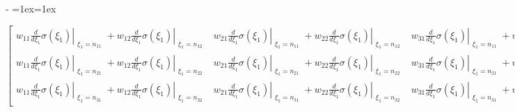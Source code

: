\documentclass[letterpaper,10pt,english]{sphinxmanual}
\makeatletter
\newenvironment{nbsphinxfancyoutput}{%
    \let\sphinxincludegraphics\nbsphinxincludegraphics
    \nbsphinx@image@maxheight\textheight
    \advance\nbsphinx@image@maxheight -2\fboxsep   %
    \advance\nbsphinx@image@maxheight -2\fboxrule  %
    \advance\nbsphinx@image@maxheight -\baselineskip
\def\nbsphinxfcolorbox{\spx@fcolorbox{nbsphinx-code-border}{white}}%
\def\FrameCommand{\nbsphinxfcolorbox\nbsphinxfancyaddprompt\@empty}%
\def\FirstFrameCommand{\nbsphinxfcolorbox\nbsphinxfancyaddprompt\sphinxVerbatim@Continues}%
\def\MidFrameCommand{\nbsphinxfcolorbox\sphinxVerbatim@Continued\sphinxVerbatim@Continues}%
\def\LastFrameCommand{\nbsphinxfcolorbox\sphinxVerbatim@Continued\@empty}%
\MakeFramed{\advance\hsize-\width\@totalleftmargin\z@\linewidth\hsize\@setminipage}%
\lineskip=1ex\lineskiplimit=1ex\raggedright%
}{\par\unskip\@minipagefalse\endMakeFramed}
\def\nbsphinxfancyaddprompt{\ifvoid\nbsphinxpromptbox\else
    \kern\fboxrule\kern\fboxsep
    \copy\nbsphinxpromptbox
    \kern-\ht\nbsphinxpromptbox\kern-\dp\nbsphinxpromptbox
    \kern-\fboxsep\kern-\fboxrule\nointerlineskip
    \fi}
\newcommand*{\nbsphinxincludegraphics}[2][]{%
    \gdef\spx@includegraphics@options{#1}%
    \setbox\spx@image@box\hbox{\texttt{[image: \#2]}}%
    \in@false
    \ifdim \wd\spx@image@box>\linewidth
      \g@addto@macro\spx@includegraphics@options{,width=\linewidth}%
      \in@true
    \fi
    \ifdim \ht\spx@image@box>\nbsphinx@image@maxheight
      \g@addto@macro\spx@includegraphics@options{,height=\nbsphinx@image@maxheight}%
      \in@true
    \fi
    \ifin@
      \g@addto@macro\spx@includegraphics@options{,keepaspectratio}%
    \fi
    \setbox\spx@image@box\box\voidb@x %
    \expandafter\includegraphics\expandafter[\spx@includegraphics@options]{#2}%
}%
\makeatother
\begin{document}
\begin{nbsphinxfancyoutput}
$\displaystyle \left[\begin{matrix}w_{11} \left. \frac{d}{d \xi_{1}} \sigma{\left(\xi_{1} \right)} \right|_{\substack{ \xi_{1}=n_{11} }} + w_{12} \left. \frac{d}{d \xi_{1}} \sigma{\left(\xi_{1} \right)} \right|_{\substack{ \xi_{1}=n_{12} }} & w_{21} \left. \frac{d}{d \xi_{1}} \sigma{\left(\xi_{1} \right)} \right|_{\substack{ \xi_{1}=n_{11} }} + w_{22} \left. \frac{d}{d \xi_{1}} \sigma{\left(\xi_{1} \right)} \right|_{\substack{ \xi_{1}=n_{12} }} & w_{31} \left. \frac{d}{d \xi_{1}} \sigma{\left(\xi_{1} \right)} \right|_{\substack{ \xi_{1}=n_{11} }} + w_{32} \left. \frac{d}{d \xi_{1}} \sigma{\left(\xi_{1} \right)} \right|_{\substack{ \xi_{1}=n_{12} }}\\w_{11} \left. \frac{d}{d \xi_{1}} \sigma{\left(\xi_{1} \right)} \right|_{\substack{ \xi_{1}=n_{21} }} + w_{12} \left. \frac{d}{d \xi_{1}} \sigma{\left(\xi_{1} \right)} \right|_{\substack{ \xi_{1}=n_{22} }} & w_{21} \left. \frac{d}{d \xi_{1}} \sigma{\left(\xi_{1} \right)} \right|_{\substack{ \xi_{1}=n_{21} }} + w_{22} \left. \frac{d}{d \xi_{1}} \sigma{\left(\xi_{1} \right)} \right|_{\substack{ \xi_{1}=n_{22} }} & w_{31} \left. \frac{d}{d \xi_{1}} \sigma{\left(\xi_{1} \right)} \right|_{\substack{ \xi_{1}=n_{21} }} + w_{32} \left. \frac{d}{d \xi_{1}} \sigma{\left(\xi_{1} \right)} \right|_{\substack{ \xi_{1}=n_{22} }}\\w_{11} \left. \frac{d}{d \xi_{1}} \sigma{\left(\xi_{1} \right)} \right|_{\substack{ \xi_{1}=n_{31} }} + w_{12} \left. \frac{d}{d \xi_{1}} \sigma{\left(\xi_{1} \right)} \right|_{\substack{ \xi_{1}=n_{32} }} & w_{21} \left. \frac{d}{d \xi_{1}} \sigma{\left(\xi_{1} \right)} \right|_{\substack{ \xi_{1}=n_{31} }} + w_{22} \left. \frac{d}{d \xi_{1}} \sigma{\left(\xi_{1} \right)} \right|_{\substack{ \xi_{1}=n_{32} }} & w_{31} \left. \frac{d}{d \xi_{1}} \sigma{\left(\xi_{1} \right)} \right|_{\substack{ \xi_{1}=n_{31} }} + w_{32} \left. \frac{d}{d \xi_{1}} \sigma{\left(\xi_{1} \right)} \right|_{\substack{ \xi_{1}=n_{32} }}\end{matrix}\right]$
\end{nbsphinxfancyoutput}
\end{document}

